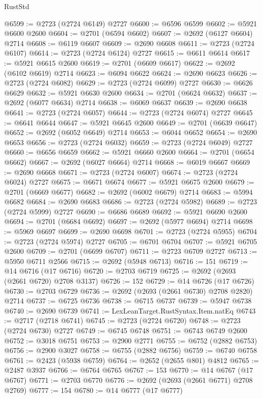 \begin{lexlean}{RustStd}
\begin{coremodule}
@6599 := @2723 (@2724 @6149) @2727
@6600 := @6596 @6599
@6602 := @5921 @6600 @2600
@6604 := @2701 (@6594 @6602)
@6607 := @2692 (@6127 @6604) @2714
@6608 := @6119 @6607
@6609 := @2690 @6608
@6611 := @2723 (@2724 @6107)
@6614 := @2723 (@2724 @6124) @2727
@6615 := @6611 @6614
@6617 := @5921 @6615 @2600
@6619 := @2701 (@6609 @6617)
@6622 := @2692 (@6102 @6619) @2714
@6623 := @6094 @6622
@6624 := @2690 @6623
@6626 := @2723 (@2724 @6082)
@6629 := @2723 (@2724 @6099) @2727
@6630 := @6626 @6629
@6632 := @5921 @6630 @2600
@6634 := @2701 (@6624 @6632)
@6637 := @2692 (@6077 @6634) @2714
@6638 := @6069 @6637
@6639 := @2690 @6638
@6641 := @2723 (@2724 @6057)
@6644 := @2723 (@2724 @6074) @2727
@6645 := @6641 @6644
@6647 := @5921 @6645 @2600
@6649 := @2701 (@6639 @6647)
@6652 := @2692 (@6052 @6649) @2714
@6653 := @6044 @6652
@6654 := @2690 @6653
@6656 := @2723 (@2724 @6032)
@6659 := @2723 (@2724 @6049) @2727
@6660 := @6656 @6659
@6662 := @5921 @6660 @2600
@6664 := @2701 (@6654 @6662)
@6667 := @2692 (@6027 @6664) @2714
@6668 := @6019 @6667
@6669 := @2690 @6668
@6671 := @2723 (@2724 @6007)
@6674 := @2723 (@2724 @6024) @2727
@6675 := @6671 @6674
@6677 := @5921 @6675 @2600
@6679 := @2701 (@6669 @6677)
@6682 := @2692 (@6002 @6679) @2714
@6683 := @5994 @6682
@6684 := @2690 @6683
@6686 := @2723 (@2724 @5982)
@6689 := @2723 (@2724 @5999) @2727
@6690 := @6686 @6689
@6692 := @5921 @6690 @2600
@6694 := @2701 (@6684 @6692)
@6697 := @2692 (@5977 @6694) @2714
@6698 := @5969 @6697
@6699 := @2690 @6698
@6701 := @2723 (@2724 @5955)
@6704 := @2723 (@2724 @5974) @2727
@6705 := @6701 @6704
@6707 := @5921 @6705 @2600
@6709 := @2701 (@6699 @6707)
@6711 := @2723 @6709 @2727
@6713 := @5950 @6711 @2566
@6715 := @2692 (@5948 @6713)
@6716 := 151
@6719 := @14 @6716 (@17 @6716)
@6720 := @2703 @6719
@6725 := @2692 (@2693 (@2661 @6720) @2708 @3137)
@6726 := 152
@6729 := @14 @6726 (@17 @6726)
@6730 := @2703 @6729
@6736 := @2692 (@2693 (@2661 @6730) @2708 @2820) @2714
@6737 := @6725 @6736
@6738 := @6715 @6737
@6739 := @5947 @6738
@6740 := @2690 @6739
@6741 := LexLeanTarget.RustSyntax.Item.natEq
@6743 := @2717 (@2718 @6741)
@6745 := @2723 (@2724 @6720)
@6748 := @2723 (@2724 @6730) @2727
@6749 := @6745 @6748
@6751 := @6743 @6749 @2600
@6752 := @3018 @6751
@6753 := @2900 @2771
@6755 := @6752 (@2882 @6753)
@6756 := @2900 @3027
@6758 := @6755 (@2882 @6756)
@6759 := @6740 @6758
@6761 := @2423 (@5938 @6759)
@6764 := @2652 (@2655 @801) @4812
@6765 := @2487 @3937
@6766 := @6764 @6765
@6767 := 153
@6770 := @14 @6767 (@17 @6767)
@6771 := @2703 @6770
@6776 := @2692 (@2693 (@2661 @6771) @2708 @2769)
@6777 := 154
@6780 := @14 @6777 (@17 @6777)

\end{coremodule}
\end{lexlean}

